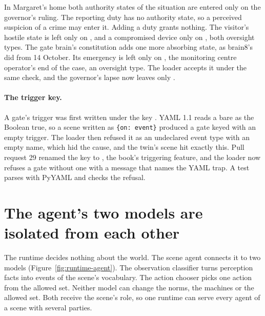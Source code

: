 In Margaret's home both authority states of the situation are entered only on the governor's ruling.
The reporting duty has no authority state, so a perceived suspicion of a crime may enter it. Adding a
duty grants nothing. The visitor's hostile state is left only on , and a
compromised device only on , both oversight types.
The gate brain's constitution adds one more absorbing state, as brain8's did from 14 October. Its emergency is
left only on , the monitoring centre operator's end of the case,
an oversight type. The loader accepts it under the same check, and the governor's lapse now leaves
only .

\paragraph{The trigger key.}
A gate's trigger was first written under the key . YAML 1.1 reads a bare  as the
Boolean true, so a scene written as \verb|{on: event}| produced a gate keyed  with an empty
trigger. The loader then refused it as an undeclared event type with an empty name, which hid the
cause, and the twin's scene hit exactly this. Pull request 29 renamed the key to , the
book's triggering feature, and the loader now refuses a gate without one with a message that names
the YAML trap. A test parses  with PyYAML and checks the refusal.

\section{The agent's two models are isolated from each other}\label{sec:runtime-agent}

The runtime decides nothing about the world. The scene agent connects it to two models
(Figure~\ref{fig:runtime-agent}). The observation classifier turns perception facts into events of
the scene's vocabulary. The action chooser picks one action from the allowed set. Neither model can
change the norms, the machines or the allowed set. Both receive the scene's role, so one runtime can
serve every agent of a scene with several parties.

